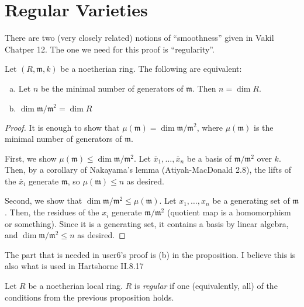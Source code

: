 

\section{Regular Varieties}

There are two (very closely related)
notions of ``smoothness'' given in Vakil Chatper 12.
The one we need for this proof is ``regularity''.

\begin{proposition} \label{prop:regular_def_equiv}
	Let \((R,\mathfrak{m},k)\) be a noetherian ring. 
	The following are equivalent:
	\begin{enumerate}[(a)]
		\item Let \(n\) be the minimal number of generators of
			\(\mathfrak{m}\).
			Then \(n = \dim R\).
		\item \(\dim \mathfrak{m} / \mathfrak{m}^{2}  = \dim R\)
	\end{enumerate}
\end{proposition}

\begin{proof}
	It is enough to show that 
	\(\mu(\mathfrak{m}) = \dim \mathfrak{m} / \mathfrak{m}^{2}\),
	where \(\mu(\mathfrak{m})\) is the minimal number of generators
	of \(\mathfrak{m}\).
	
	First, we show \(\mu(\mathfrak{m}) \leq \dim \mathfrak{m} / \mathfrak{m}^{2}\).
	Let \(\overline{x}_{1}, \ldots, \overline{x}_{n}\) 
	be a basis of \(\mathfrak{m} / \mathfrak{m}^{2}\) 
	over \(k\).
	Then, by a corollary of Nakayama's lemma (Atiyah-MacDonald 2.8),
	the lifts of the \(\overline{x}_{i}\) generate \(\mathfrak{m}\),
	so \(\mu(\mathfrak{m}) \leq n\) as desired.

	Second, we show that 
	\(\dim \mathfrak{m} / \mathfrak{m}^{2} \leq \mu(\mathfrak{m})\).
	Let \(x_{1}, \ldots, x_{n}\) be a generating set of 
	\(\mathfrak{m}\).
	Then, the residues of the \(x_{i}\) generate 
	\(\mathfrak{m} / \mathfrak{m}^{2}\) (quotient map is a 
	homomorphism or something).
	Since it is a generating set, it contains a basis by
	linear algebra, and
	\(\dim \mathfrak{m} / \mathfrak{m}^{2} \leq n\) as desired.
\end{proof}

The part that is needed in user6's proof is (b) in the proposition.
I believe this is also what is used in Hartshorne II.8.17

\begin{definition} \label{def:regular}
	Let \(R\) be a noetherian local ring.
	\(R\) is \textit{regular} if one (equivalently, all)
	of the conditions from the previous proposition holds.
\end{definition}

